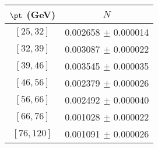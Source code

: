 \begin{tabular}{c||c}
$\pt$ (GeV) & $N$  \\
\hline
$[25, 32]$ & 0.002658 $\pm$ 0.000014\\
$[32, 39]$ & 0.003087 $\pm$ 0.000022\\
$[39, 46]$ & 0.003545 $\pm$ 0.000035\\
$[46, 56]$ & 0.002379 $\pm$ 0.000026\\
$[56, 66]$ & 0.002492 $\pm$ 0.000040\\
$[66, 76]$ & 0.001028 $\pm$ 0.000022\\
$[76, 120]$ & 0.001091 $\pm$ 0.000026\\
\end{tabular}
